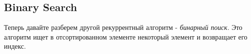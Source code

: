 \documentclass[../book.tex]{subfiles}
\begin{document}
					
					
				
					
					

	
	\subsection{Binary Search}
	
	Теперь давайте разберем другой рекуррентный алгоритм - \textit{бинарный поиск}. Это алгоритм ищет в отсортированном элементе некоторый элемент и возвращает его индекс.
		
\end{document}
